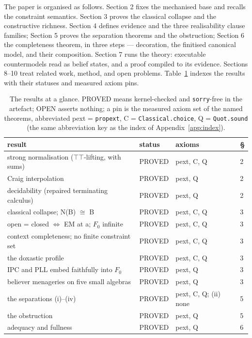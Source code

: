The paper is organised as follows. Section 2 fixes the mechanised base
and recalls the constraint semantics. Section 3 proves the classical
collapse and the constructive richness. Section 4 defines evidence and
the three realisability clause families; Section 5 proves the
separation theorems and the obstruction; Section 6 the completeness
theorem, in three steps --- decoration, the finitised canonical model,
and their composition. Section 7 runs the theory: executable
countermodels read as belief states, and a proof compiled to its
evidence. Sections 8--10 treat related work, method, and open problems.
Table~\ref{tab:glance} indexes the results with their statuses and
measured axiom pins.

\begin{table}
\caption{The results at a glance. PROVED means kernel-checked and
\texttt{sorry}-free in the artefact; OPEN asserts nothing; a pin is
the measured axiom set of the named theorems, abbreviated
pext = \texttt{propext}, C = \texttt{Classical.choice},
Q = \texttt{Quot.sound} (the same abbreviation key as the index of
Appendix~\ref{app:index}).}
\label{tab:glance}
\small
\begin{tabular}{@{}llll@{}}
\toprule
result & status & axioms & \S \\
\midrule
strong normalisation (\ensuremath{\top\top}-lifting, with sums) & PROVED & pext, C, Q & 2 \\
Craig interpolation & PROVED & pext, Q & 2 \\
decidability (repaired terminating calculus) & PROVED & pext, Q & 2 \\
classical collapse; N(B) \ensuremath{\cong} B & PROVED & pext, C, Q & 3 \\
open = closed \ensuremath{\Leftrightarrow} EM at a; \ensuremath{F_{0}} infinite & PROVED & pext, C, Q & 3 \\
context completeness; no finite constraint set & PROVED & pext, C, Q & 3 \\
the doxastic profile & PROVED & pext, C, Q & 3 \\
IPC and PLL embed faithfully into \ensuremath{F_{0}} & PROVED & pext, Q & 3 \\
believer menageries on five small algebras & PROVED & pext, Q & 3 \\
the separations (i)--(iv) & PROVED & pext, C, Q; (ii) none & 5 \\
the obstruction & PROVED & pext, Q & 5 \\
adequacy and fullness & PROVED & pext, Q & 6 \\

\end{tabular}
\end{table}
